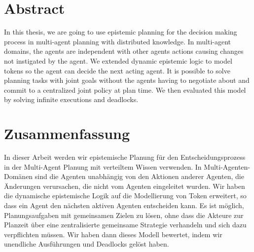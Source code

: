 \chapter*{Abstract}

In this thesis, we are going to use epistemic planning for the decision making process in multi-agent planning with distributed knowledge. In multi-agent domains, the agents are independent with other agents actions causing changes not instigated by the agent. We extended dynamic epistemic logic to model tokens so the agent can decide the next acting agent. It is possible to solve planning tasks with joint goals without the agents having to negotiate about and commit to a centralized joint policy at plan time. We then evaluated this model by solving infinite executions and deadlocks.

\chapter*{Zusammenfassung}

In dieser Arbeit werden wir epistemische Planung für den Entscheidungsprozess in der Multi-Agent Planung mit verteiltem Wissen verwenden. In Multi-Agenten-Domänen sind die Agenten unabhängig von den Aktionen anderer Agenten, die Änderungen verursachen, die nicht vom Agenten eingeleitet wurden. Wir haben die dynamische epistemische Logik auf die Modellierung von Token erweitert, so dass ein Agent den nächsten aktiven Agenten entscheiden kann. Es ist möglich, Planungsaufgaben mit gemeinsamen Zielen zu lösen, ohne dass die Akteure zur Planzeit über eine zentralisierte gemeinsame Strategie verhandeln und sich dazu verpflichten müssen. Wir haben dann dieses Modell bewertet, indem wir unendliche Ausführungen und Deadlocks gelöst haben.
